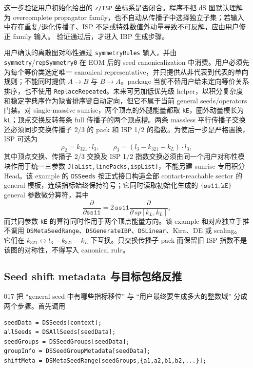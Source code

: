 ﻿\documentclass[a4paper,11pt]{article}
\begin{document}
这一步验证用户初始化给出的 \texttt{z/ISP} 坐标系是否闭合。程序不把 dS 图默认理解为 overcomplete propagator family，也不自动从传播子中选择独立子集；若输入中存在重复/退化传播子、ISP 不足或特殊数值外动量导致不可反解，应由用户修正 family 输入。
验证通过后，才进入 IBP 生成步骤。

用户确认的离散图对称性通过 \texttt{symmetryRules} 输入，并由 \texttt{symmetry}/\texttt{repSymmetry0} 在 EOM 后的 seed canonicalization 中消费。用户必须先为每个等价类选定唯一 canonical representative，并只提供从非代表到代表的单向规则；不能同时提供 $A\to B$ 与 $B\to A$。package 当前不替用户给未定向等价关系排序，也不使用 \texttt{ReplaceRepeated}。未来可另加低优先级 helper，以积分复杂度和稳定字典序作为缺省排序键自动定向，但它不属于当前 general seeds/operators 门禁。对 single-massive sunrise，两个顶点的外腿能量都取 \texttt{kE}，圈外动量模长为 \texttt{kL}；顶点交换反转每条 full 传播子的两个顶点槽。两条 massless 平行传播子交换还必须同步交换传播子 2/3 的 pack 和 ISP 1/2 的指数。为使后一步是严格置换，ISP 可选为
\begin{equation}
 \rho_2=k_{321}\!\cdot l_3,\qquad
 \rho_3=(l_3-k_{321}-k_L)\!\cdot l_3,
\end{equation}
其中顶点交换、传播子 2/3 交换及 ISP 1/2 指数交换必须由同一个用户对称性模块作用于统一三参数 \texttt{J[aList,linePacks,ispList]}，不能另建 sunrise 专用积分 Head。该 example 的 \texttt{DSSeeds} 按正式接口构造全部 contact-reachable sector 的 general 模板，连续指标始终保持符号；它同时读取初始化生成的 $\{\texttt{ss11},\texttt{kE}\}$ general 参数微分算符，其中
\begin{equation}
 \frac{\partial}{\partial\texttt{ss11}}
 =2\,\texttt{ss11}\frac{\partial}{\partial\,sp[k_L,k_L]},
\end{equation}
而共同参数 \texttt{kE} 的算符同时作用于两个顶点能量方向。该 example 和对应独立手推不调用 \texttt{DSMetaSeedRange}、\texttt{DSGenerateIBP}、\texttt{DSLinear}、Kira、DE 或 scaling。
它们在 $k_{321}\leftrightarrow l_3-k_{321}-k_L$ 下互换。只交换传播子 pack 而保留旧 ISP 指数不是该图的对称性，不得写入 canonical rule。

\subsection{Seed shift metadata 与目标包络反推}

017 把 ``general seed 中有哪些指标移位'' 与 ``用户最终要生成多大的整数域'' 分成两个步骤。首先调用
\begin{verbatim}
seedData = DSSeeds[context];
allSeeds = DSAllSeeds[seedData];
seedGroups = DSSeedGroups[seedData];
groupInfo = DSSeedGroupMetadata[seedData];
shiftMeta = DSMetaSeedRange[seedGroups,{a1,a2,b1,b2,...}];
\end{verbatim}
\end{document}
